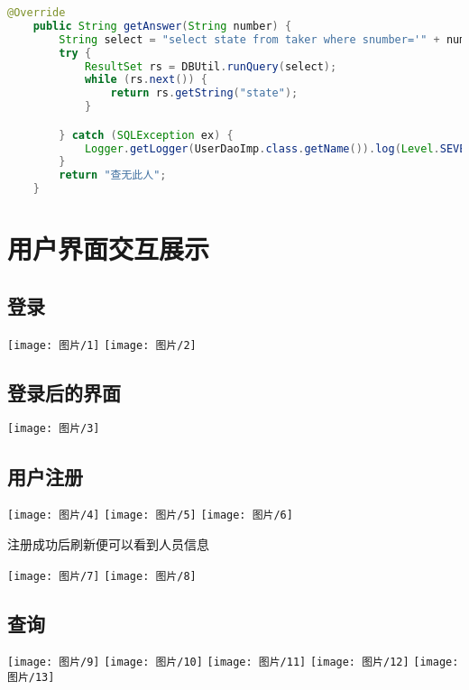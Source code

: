 \documentclass{article}
\begin{document}
\begin{lstlisting}[language = java]
   @Override
	public String getAnswer(String number) {
		String select = "select state from taker where snumber='" + number + "'";
		try {
			ResultSet rs = DBUtil.runQuery(select);
			while (rs.next()) {
				return rs.getString("state");
			}

		} catch (SQLException ex) {
			Logger.getLogger(UserDaoImp.class.getName()).log(Level.SEVERE, null, ex);
		}
		return "查无此人";
	}
\end{lstlisting}

\section{用户界面交互展示}
\subsection{登录}
\begin{center}
\texttt{[image: 图片/1]}
\texttt{[image: 图片/2]}
\end{center}
\subsection{登录后的界面}
\begin{center}
\texttt{[image: 图片/3]}
\end{center}
\subsection{用户注册}
\begin{center}
\texttt{[image: 图片/4]}
\texttt{[image: 图片/5]}
\texttt{[image: 图片/6]}
\end{center}
注册成功后刷新便可以看到人员信息
\begin{center}
\texttt{[image: 图片/7]}
\texttt{[image: 图片/8]}
\end{center}
\subsection{查询}
\begin{center}
\texttt{[image: 图片/9]}
\texttt{[image: 图片/10]}
\texttt{[image: 图片/11]}
\texttt{[image: 图片/12]}
\texttt{[image: 图片/13]}
\end{center}
\end{document}
